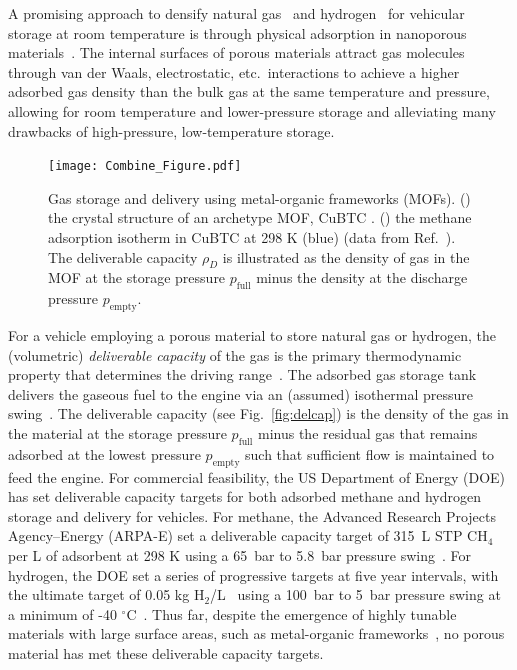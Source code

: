 \documentclass[twoside,twocolumn,9pt]{article}
\newcommand\pfull{\ensuremath{p_{\text{full}}}}
\newcommand\pempty{\ensuremath{p_{\text{empty}}}}
\begin{document}
A promising approach to densify natural
gas~\cite{makal2012methane,mason2014evaluating} and
hydrogen~\cite{suh2011hydrogen,garcia2018benchmark} for vehicular storage at
room temperature is through physical adsorption in nanoporous
materials~\cite{schoedel2016role}. The internal surfaces of porous materials
attract gas molecules through van der Waals, electrostatic, etc.\ interactions
to achieve a higher adsorbed gas density than the bulk gas at the same
temperature and pressure, allowing for room temperature and lower-pressure
storage and alleviating many drawbacks of high-pressure, low-temperature
storage.

\begin{figure}
    \centering
    \texttt{[image: Combine\_Figure.pdf]}
    \begin{minipage}{0.25\textwidth}
    \end{minipage}
    \begin{minipage}{0.25\textwidth}
    \end{minipage}
    
    \caption{\label{fig:fig1} Gas storage and delivery using metal-organic frameworks (MOFs). () the crystal structure of an archetype MOF, CuBTC \cite{chui1999chemically}. () the methane adsorption isotherm in CuBTC \cite{chui1999chemically} at 298 K (blue) (data from Ref.~\cite{mason2014evaluating}). The deliverable capacity $\rho_D$ is illustrated as the density of gas in the MOF at the storage pressure $\pfull$ minus the density at the discharge pressure $\pempty$.}
\end{figure}

For a vehicle employing a porous material to store natural gas or hydrogen, the
(volumetric) \emph{deliverable capacity} of the gas is the primary
thermodynamic property that determines the driving
range~\cite{mason2014evaluating}. The adsorbed gas storage tank delivers the
gaseous fuel to the engine via an (assumed) isothermal pressure
swing~\cite{sircar2002pressure}. The deliverable capacity (see
Fig.~\ref{fig:delcap}) is the density of the gas in the material at the storage
pressure $\pfull$ minus the residual gas that remains adsorbed at the lowest
pressure $\pempty$ such that sufficient flow is maintained to feed the engine.
For commercial feasibility, the US Department of Energy (DOE) has set
deliverable capacity targets for both adsorbed methane and hydrogen storage and
delivery for vehicles. For methane, the Advanced Research Projects
Agency--Energy (ARPA-E) set a deliverable capacity target of 315\ L STP CH$_4$
per L of adsorbent at 298 K using a 65\ bar to 5.8\ bar pressure
swing~\cite{simon2015materials}. For hydrogen, the DOE set a series of
progressive targets at five year intervals, with the ultimate target of 0.05 kg
H$_2$/L~\cite{h2targetsDOE} using a 100\ bar to 5\ bar pressure swing at a
minimum of -40 $^\circ$C~\cite{allendorf2018assessment}. Thus far, despite the
emergence of highly tunable materials with large surface areas, such as
metal-organic frameworks~\cite{furukawa2013chemistry}, no porous material has
met these deliverable capacity targets.
\end{document}
